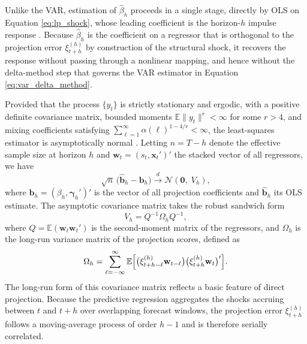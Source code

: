 Unlike the VAR, estimation of $\hat{\beta}_h$ proceeds in a single stage, directly by OLS on
Equation \eqref{eq:lp_shock}, whose leading coefficient is the horizon-$h$ impulse response
\parencite{jorda2025local}. Because $\hat{\beta}_h$ is the coefficient on a regressor that is
orthogonal to the projection error $\xi_{t+h}^{(h)}$ by construction of the structural shock, it
recovers the response without passing through a nonlinear mapping, and hence without the
delta-method step that governs the VAR estimator in Equation \eqref{eq:var_delta_method}.

Provided that the process $\{y_t\}$ is strictly stationary and ergodic, with a positive definite
covariance matrix, bounded moments $\mathbb{E}\lVert y_t \rVert^{r} < \infty$ for some $r > 4$, and
mixing coefficients satisfying $\sum_{\ell=1}^{\infty} \alpha(\ell)^{1-4/r} < \infty$, the
least-squares estimator is asymptotically normal \parencite{hansen2022econometrics}. Letting
$n = T - h$ denote the effective sample size at horizon $h$ and
$\mathbf{w}_t = (s_t, \mathbf{x}_t')'$ the stacked vector of all regressors, we have
%
\begin{equation}
    \sqrt{n}\,\bigl(\hat{\mathbf{b}}_h - \mathbf{b}_h\bigr)
    \xrightarrow{d} \mathcal{N}\!\left(\mathbf{0},\; V_h\right),
    \label{eq:lp_clt}
\end{equation}
%
where $\mathbf{b}_h = (\beta_h, \boldsymbol{\gamma}_h')'$ is the vector of all projection
coefficients and $\hat{\mathbf{b}}_h$ its OLS estimate. The asymptotic covariance matrix takes the
robust sandwich form
%
\begin{equation}
    V_h = Q^{-1} \Omega_h Q^{-1},
\end{equation}
%
where $Q = \mathbb{E}(\mathbf{w}_t \mathbf{w}_t')$ is the second-moment matrix of the regressors,
and $\Omega_h$ is the long-run variance matrix of the projection scores, defined as
%
\begin{equation}
    \Omega_h = \sum_{\ell=-\infty}^{\infty} \mathbb{E}\Bigl[\bigl(\xi_{t+h-\ell}^{(h)} \mathbf{w}_{t-\ell}\bigr) \bigl(\xi_{t+h}^{(h)} \mathbf{w}_t\bigr)'\Bigr].
\end{equation}
%
The long-run form of this covariance matrix reflects a basic feature of direct projection. Because
the predictive regression aggregates the shocks accruing between $t$ and $t+h$ over overlapping
forecast windows, the projection error $\xi_{t+h}^{(h)}$ follows a moving-average process of order
$h-1$ and is therefore serially correlated.

